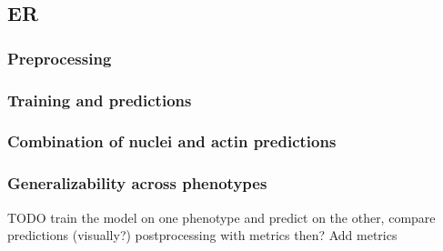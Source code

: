\subsection{ER}
    \subsubsection{Preprocessing}
        
    \subsubsection{Training and predictions}
        
    \subsubsection{Combination of nuclei and actin predictions}
        
    \subsubsection{Generalizability across phenotypes}
        TODO train the model on one phenotype and predict on the other, compare predictions (visually?) 
        postprocessing with metrics then?
        Add metrics
